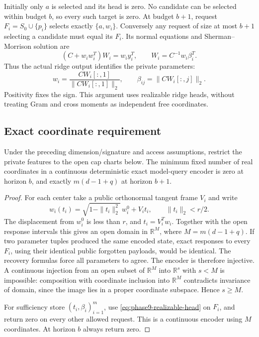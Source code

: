 Initially only $a$ is selected and its head is zero.  No candidate can be
selected within budget $b$, so every such target is zero.  At budget $b+1$,
request $F_i=S_0\cup\{p_i\}$ selects exactly $\{a,w_i\}$.  Conversely any
request of size at most $b+1$ selecting a candidate must equal its $F_i$.
Its normal equations and Sherman--Morrison solution are
\begin{equation}\label{eq:phase9-realizable-head}
 (C+w_iw_i^T)W_i=w_i y_i^T,
 \qquad W_i=C^{-1}w_i\beta_i^T.
\end{equation}
Thus the actual ridge output identifies the private parameters:
\[
 w_i=\frac{CW_i[:,1]}{\|CW_i[:,1]\|_2},\qquad
 \beta_{ij}=\|CW_i[:,j]\|_2.
\]
Positivity fixes the sign.  This argument uses realizable ridge heads,
without treating Gram and cross moments as independent free coordinates.

\subsection{Exact coordinate requirement}
\begin{theorem}
Under the preceding dimension/signature and access assumptions, restrict
the private features to the open cap charts below.  The minimum fixed
number of real coordinates in a continuous deterministic exact model-query
encoder is zero at horizon $b$, and exactly $m(d-1+q)$ at horizon $b+1$.
\end{theorem}
\begin{proof}
For each center take a public orthonormal tangent frame $V_i$ and write
\[
 w_i(t_i)=\sqrt{1-\|t_i\|_2^2}\,w_i^0+V_i t_i,
 \qquad \|t_i\|_2<r/2.
\]
The displacement from $w_i^0$ is less than $r$, and
$t_i=V_i^Tw_i$.  Together with the open response intervals this gives an
open domain in $\mathbb R^M$, where $M=m(d-1+q)$.
If two parameter tuples produced the same encoded state, exact responses
to every $F_i$, using their identical public forgotten payloads, would be
identical.  The recovery formulas force all parameters to agree.  The
encoder is therefore injective.  A continuous injection from an open
subset of $\mathbb R^M$ into $\mathbb R^s$ with $s<M$ is impossible:
composition with coordinate inclusion into $\mathbb R^M$ contradicts
invariance of domain, since the image lies in a proper coordinate subspace.
Hence $s\ge M$.

For sufficiency store $(t_i,\beta_i)_{i=1}^m$, use
\eqref{eq:phase9-realizable-head} on $F_i$, and return zero on every other
allowed request.  This is a continuous encoder using $M$ coordinates.
At horizon $b$ always return zero.
\end{proof}

